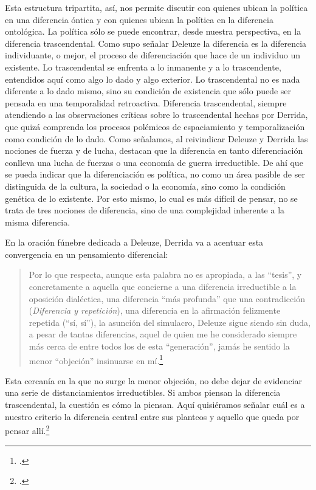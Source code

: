 Esta estructura tripartita, así, nos permite discutir con quienes ubican la política en una diferencia óntica y con quienes ubican la política en la diferencia ontológica. La política sólo se puede encontrar, desde nuestra perspectiva, en la diferencia trascendental. Como supo señalar Deleuze la diferencia es la diferencia individuante, o mejor, el proceso de diferenciación que hace de un individuo un existente. Lo trascendental se enfrenta a lo inmanente y a lo trascendente, entendidos aquí como algo lo dado y algo exterior. Lo trascendental no es nada diferente a lo dado mismo, sino su condición de existencia que sólo puede ser pensada en una temporalidad retroactiva. Diferencia trascendental, siempre atendiendo a las observaciones críticas sobre lo trascendental hechas por Derrida, que quizá comprenda los procesos polémicos de espaciamiento y temporalización como condición de lo dado. Como señalamos, al reivindicar Deleuze y Derrida las nociones de fuerza y de lucha, destacan que la diferencia en tanto diferenciación conlleva una lucha de fuerzas o una economía de guerra irreductible. De ahí que se pueda indicar que la diferenciación es política, no como un área pasible de ser distinguida de la cultura, la sociedad o la economía, sino como la condición genética  de lo existente. Por esto mismo, lo cual es más difícil de pensar, no se trata de tres nociones de diferencia, sino de una complejidad inherente a la misma diferencia.

En la oración fúnebre dedicada a Deleuze, Derrida va a acentuar esta convergencia en un pensamiento diferencial:

\begin{quote}
Por lo que respecta, aunque esta palabra no es apropiada, a las \enquote{tesis}, y concretamente a aquella que concierne a una diferencia irreductible a la oposición dialéctica, una diferencia \enquote{más profunda} que una contradicción (\emph{Diferencia y repetición}), una diferencia en la afirmación felizmente repetida (\enquote{sí, sí}), la asunción del simulacro, Deleuze sigue siendo sin duda, a pesar de tantas diferencias, aquel de quien me he considerado siempre más cerca de entre todos los de esta \enquote{generación}, jamás he sentido la menor \enquote{objeción} insinuarse en mí.\footcite{@6994-DERRIDA2005}
\end{quote}

Esta cercanía en la que no surge la menor objeción, no debe dejar de evidenciar una serie de distanciamientos irreductibles. Si ambos piensan la diferencia trascendental, la cuestión es cómo la piensan. Aquí quisiéramos señalar cuál es a nuestro criterio la diferencia central entre sus planteos y aquello que queda por pensar allí.\footcites[Quizá otra distancia surja de las formas de abordar la tradición, en la tensión entre una lectura crítica minuciosa de la tradición y una apuesta a la creación de algo nuevo: \enquote{(\dots) pues no se trata solamente de apuntar, a causa de la indecisión, a la detención de las proposiciones del discurso metafísico, sino sobre todo a la invención de un discurso diferente que fluye y abre en otro lugar otras formas de pensar y de sentir}.][114]{@6985-MENGUE2008}

